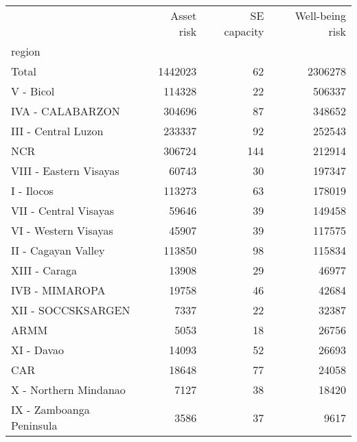 \begin{tabular}{lrrr}
\toprule
{} &  Asset risk &  SE capacity &  Well-being risk \\
region                   &             &              &                  \\
\midrule
Total                    &     1442023 &           62 &          2306278 \\
V - Bicol                &      114328 &           22 &           506337 \\
IVA - CALABARZON         &      304696 &           87 &           348652 \\
III - Central Luzon      &      233337 &           92 &           252543 \\
NCR                      &      306724 &          144 &           212914 \\
VIII - Eastern Visayas   &       60743 &           30 &           197347 \\
I - Ilocos               &      113273 &           63 &           178019 \\
VII - Central Visayas    &       59646 &           39 &           149458 \\
VI - Western Visayas     &       45907 &           39 &           117575 \\
II - Cagayan Valley      &      113850 &           98 &           115834 \\
XIII - Caraga            &       13908 &           29 &            46977 \\
IVB - MIMAROPA           &       19758 &           46 &            42684 \\
XII - SOCCSKSARGEN       &        7337 &           22 &            32387 \\
ARMM                     &        5053 &           18 &            26756 \\
XI - Davao               &       14093 &           52 &            26693 \\
CAR                      &       18648 &           77 &            24058 \\
X - Northern Mindanao    &        7127 &           38 &            18420 \\
IX - Zamboanga Peninsula &        3586 &           37 &             9617 \\
\bottomrule
\end{tabular}
